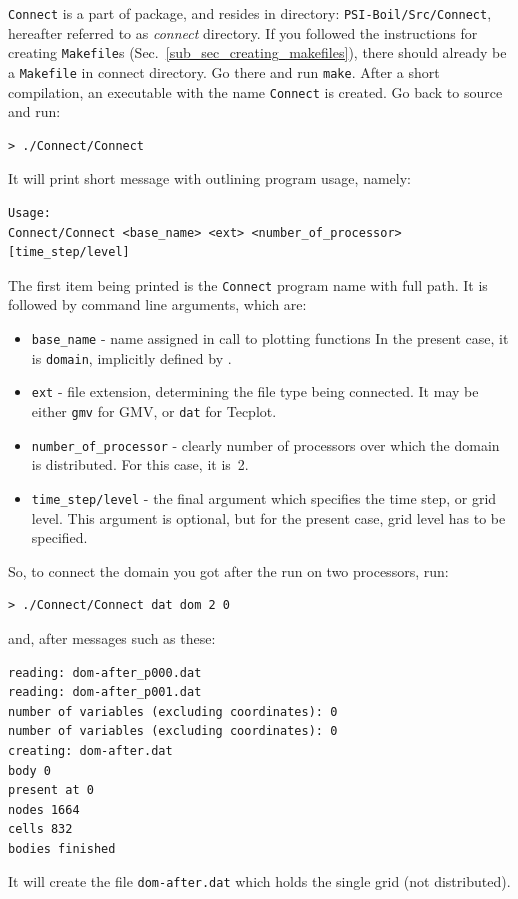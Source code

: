 {\tt Connect} is a part of {\psiboil} package, and resides in directory:
{\tt PSI-Boil/Src/Connect}, hereafter referred to as {\em connect}
directory. If you followed the instructions for creating
{\tt Makefile}s (Sec.~\ref{sub_sec_creating_makefiles}), there should 
already be a {\tt Makefile} in connect directory. Go there and run
{\tt make}. After a short compilation, an executable with the name 
{\tt Connect} is created. Go back to source and run:
%
\begin{verbatim}
> ./Connect/Connect
\end{verbatim}
%
It will print short message with outlining program usage, namely:
%
{\small \begin{verbatim}
Usage:
Connect/Connect <base_name> <ext> <number_of_processor> [time_step/level]
\end{verbatim}}
%
The first item being printed is the {\tt Connect} program name with full
path. It is followed by command line arguments, which are:
%
\begin{itemize}
  \item {\tt base\_name} - name assigned in call to plotting functions
        In the present case, it is {\tt domain}, implicitly defined
        by {\psiboil}.
  \item {\tt ext} - file extension, determining the file type being connected. 
        It may be either {\tt gmv} for GMV, or {\tt dat} for Tecplot. 
  \item {\tt number\_of\_processor} - clearly number of processors over which 
        the domain is distributed. For this case, it is~2. 
  \item {\tt time\_step/level} - the final argument which specifies the time 
        step, or grid level. This argument is optional, but for the present 
        case, grid level has to be specified. 
\end{itemize}
%
So, to connect the domain you got after the run on two processors, run:
%
\begin{verbatim}
> ./Connect/Connect dat dom 2 0
\end{verbatim}
%
and, after messages such as these:
%
{\small \begin{verbatim}
reading: dom-after_p000.dat
reading: dom-after_p001.dat
number of variables (excluding coordinates): 0
number of variables (excluding coordinates): 0
creating: dom-after.dat
body 0
present at 0
nodes 1664
cells 832
bodies finished
\end{verbatim}}
%
It will create the file {\tt dom-after.dat} which holds the single grid (not
distributed). 

